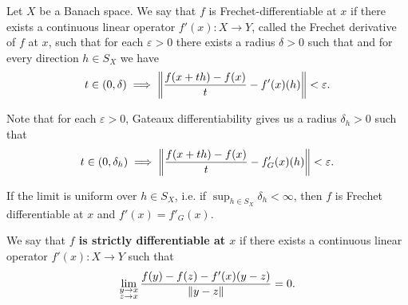 \begin{definition}
\begin{defenum}
    \cite[definition 1.12]{Phelps1993} Let \( X \) be a Banach space. We say that \( f \) is Frechet-differentiable at \( x \) if there exists a continuous linear operator \( f'(x): X \to Y \), called the Frechet derivative of \( f \) at \( x \), such that for each \( \varepsilon > 0 \) there exists a radius \( \delta > 0 \) such that and for every direction \( h \in S_X \) we have
    \begin{equation*}
      t \in (0, \delta) \implies \left\Vert  \frac {f(x + th) - f(x)} t - f'(x)(h) \right\Vert < \varepsilon.
    \end{equation*}

    Note that for each \( \varepsilon > 0 \), Gateaux differentiability gives us a radius \( \delta_h > 0 \) such that
    \begin{equation*}
      t \in (0, \delta_h) \implies \left\Vert  \frac {f(x + th) - f(x)} t - f_G'(x)(h) \right\Vert < \varepsilon.
    \end{equation*}

    If the limit is uniform over \( h \in S_X \), i.e. if \( \sup_{h \in S_X} \delta_h < \infty \), then \( f \) is Frechet differentiable at \( x \) and \( f'(x) = f'_G(x) \).

    \cite[33]{Dontchev2014} We say that \textbf{\( f \) is strictly differentiable at \( x \)} if there exists a continuous linear operator \( f'(x): X \to Y \) such that
    \begin{equation*}
      \lim_{\substack{y \to x \\ z \to x}} \frac{f(y) - f(z) - f'(x)(y - z)} {\left\Vert y - z \right\Vert} = 0.
    \end{equation*}
  \end{defenum}
\end{definition}
